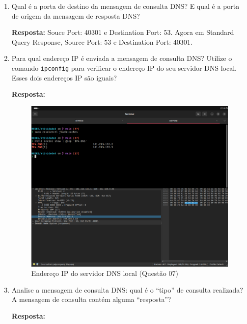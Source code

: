\documentclass[12pt,a4paper]{report}
\begin{document}
\begin{enumerate}
		\item Qual é a porta de destino da mensagem de consulta DNS? E qual é a porta de origem da mensagem de resposta DNS?
		
		\textbf{Resposta:} Souce Port: 40301 e Destination Port: 53. Agora em Standard Query Response, Source Port: 53 e Destination Port: 40301.

		\item Para qual endereço IP é enviada a mensagem de consulta DNS? Utilize o comando \texttt{ipconfig} para verificar o endereço IP do seu servidor DNS local. Esses dois endereços IP são iguais?
		
		\textbf{Resposta:} 

		\begin{figure}[H]
			\centering
			\includegraphics[width=1\textwidth]{q7.png}
			\caption{Endereço IP do servidor DNS local (Questão 07)}
			\label{fig:q7}
		\end{figure}

		\item Analise a mensagem de consulta DNS: qual é o “tipo” de consulta realizada? A mensagem de consulta contém alguma “resposta”?
		
		\textbf{Resposta:}


\end{enumerate}
\end{document}
